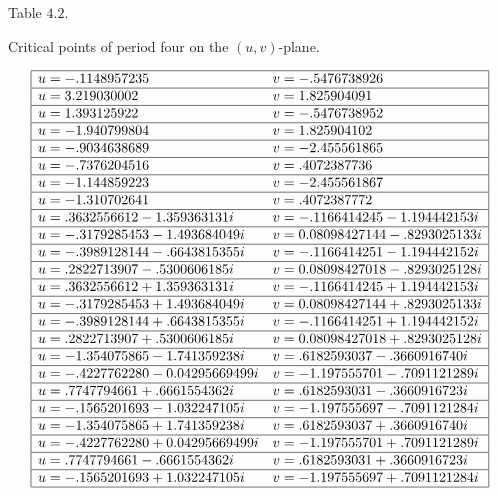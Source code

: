 \documentclass[12pt,a4paper]{amsart}
\numberwithin{equation}{section}
\numberwithin{lause}{section}
\begin{document}
\begin{table}[h]
\begin{center}
Table $4.2$.
\end{center}
\begin{center}
  Critical points of period four on the $(u,v)$-plane.
\end{center}
\begin{displaymath}
\begin{array}{|ll|}
       \hline
u=-.1148957235& v=-.5476738926\\\hline u=3.219030002& v=1.825904091 \\\hline u=1.393125922& v=-.5476738952 \\\hline u=-1.940799804& v=1.825904102 \\\hline u=-.9034638689& v=-2.455561865 \\\hline u=-.7376204516& v=.4072387736 \\\hline u=-1.144859223& v=-2.455561867 \\\hline u=-1.310702641& v=.4072387772 \\\hline u=.3632556612-1.359363131i& v=-.1166414245-1.194442153i \\\hline u=-.3179285453-1.493684049i& v=0.08098427144-.8293025133i \\\hline u=-.3989128144-.6643815355i& v=-.1166414251-1.194442152i \\\hline u=.2822713907-.5300606185i& v=0.08098427018-.8293025128i \\\hline u=.3632556612+1.359363131i& v=-.1166414245+1.194442153i \\\hline u=-.3179285453+1.493684049i& v=0.08098427144+.8293025133i \\\hline u=-.3989128144+.6643815355i& v=-.1166414251+1.194442152i \\\hline u= .2822713907+.5300606185i& v=0.08098427018+.8293025128i \\\hline u=-1.354075865-1.741359238i& v=.6182593037-.3660916740i \\\hline u=-.4227762280-0.04295669499i& v=-1.197555701-.7091121289i \\\hline u=.7747794661+.6661554362i& v=.6182593031-.3660916723i \\\hline u=-.1565201693-1.032247105i& v=-1.197555697-.7091121284i \\\hline u=-1.354075865+1.741359238i& v=.6182593037+.3660916740i \\\hline u=-.4227762280+0.04295669499i& v=-1.197555701+.7091121289i \\\hline u=.7747794661-.6661554362i& v=.6182593031+.3660916723i \\\hline u=-.1565201693+1.032247105i & v=-1.197555697+.7091121284i \\\hline
\end{array}
\end{displaymath}
\end{table}
\end{document}
